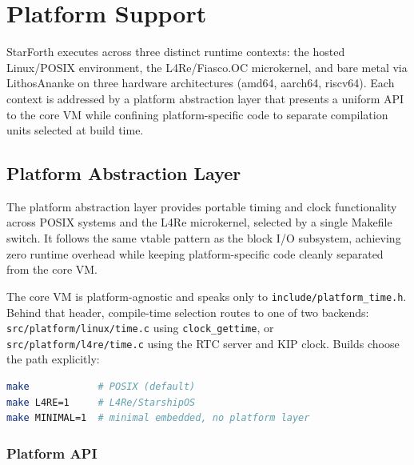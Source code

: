 
\chapter{Platform Support}
\label{vol2:chap:platforms}

StarForth executes across three distinct runtime contexts: the hosted
Linux/POSIX environment, the L4Re/Fiasco.OC microkernel, and bare metal
via LithosAnanke on three hardware architectures (amd64, aarch64, riscv64).
Each context is addressed by a platform abstraction layer that presents a
uniform API to the core VM while confining platform-specific code to
separate compilation units selected at build time.

\section{Platform Abstraction Layer}
\label{vol2:sec:platforms:pal}


The platform abstraction layer provides portable timing and clock
functionality across POSIX systems and the L4Re microkernel, selected by a
single Makefile switch. It follows the same vtable pattern as the block I/O
subsystem, achieving zero runtime overhead while keeping platform-specific
code cleanly separated from the core VM.

The core VM is platform-agnostic and speaks only to
\texttt{include/platform\_time.h}. Behind that header, compile-time
selection routes to one of two backends:
\texttt{src/platform/linux/time.c} using \texttt{clock\_gettime}, or
\texttt{src/platform/l4re/time.c} using the RTC server and KIP clock.
Builds choose the path explicitly:

\begin{lstlisting}[language=bash]
make            # POSIX (default)
make L4RE=1     # L4Re/StarshipOS
make MINIMAL=1  # minimal embedded, no platform layer
\end{lstlisting}

\subsection{Platform API}

